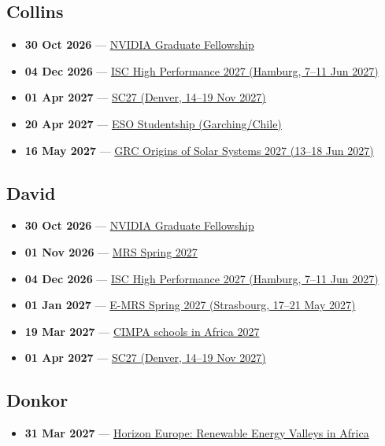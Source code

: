 \subsection*{Collins}
\begin{itemize}[leftmargin=1.4em,itemsep=0.1em]
  \item \textbf{30 Oct 2026} --- \href{https://research.nvidia.com/graduate-fellowships}{NVIDIA Graduate Fellowship}
  \item \textbf{04 Dec 2026} --- \href{https://isc-hpc.com/}{ISC High Performance 2027 (Hamburg, 7--11 Jun 2027)}
  \item \textbf{01 Apr 2027} --- \href{https://supercomputing.org/}{SC27 (Denver, 14--19 Nov 2027)}
  \item \textbf{20 Apr 2027} --- \href{http://www.hq.eso.org/sci/activities/fellowships-and-studentships/FeSt-overview.html}{ESO Studentship (Garching/Chile)}
  \item \textbf{16 May 2027} --- \href{https://www.grc.org/origins-of-solar-systems-conference/2027/}{GRC Origins of Solar Systems 2027 (13--18 Jun 2027)}
\end{itemize}

\subsection*{David}
\begin{itemize}[leftmargin=1.4em,itemsep=0.1em]
  \item \textbf{30 Oct 2026} --- \href{https://research.nvidia.com/graduate-fellowships}{NVIDIA Graduate Fellowship}
  \item \textbf{01 Nov 2026} --- \href{https://www.mrs.org/docs/default-source/meetings-events/spring-meetings/2027/s27-call-for-abstracts.pdf}{MRS Spring 2027}
  \item \textbf{04 Dec 2026} --- \href{https://isc-hpc.com/}{ISC High Performance 2027 (Hamburg, 7--11 Jun 2027)}
  \item \textbf{01 Jan 2027} --- \href{https://www.european-mrs.com/meetings/2027-spring-meeting-exhibit}{E-MRS Spring 2027 (Strasbourg, 17--21 May 2027)}
  \item \textbf{19 Mar 2027} --- \href{https://www.cimpa.info/}{CIMPA schools in Africa 2027}
  \item \textbf{01 Apr 2027} --- \href{https://supercomputing.org/}{SC27 (Denver, 14--19 Nov 2027)}
\end{itemize}

\subsection*{Donkor}
\begin{itemize}[leftmargin=1.4em,itemsep=0.1em]
  \item \textbf{31 Mar 2027} --- \href{https://www.africaeuropeinnovation.net/fr/opportunites-de-financement/}{Horizon Europe: Renewable Energy Valleys in Africa}
\end{itemize}

